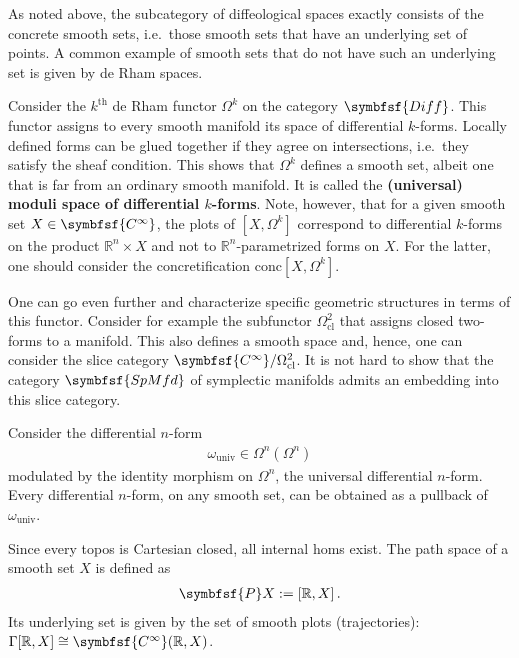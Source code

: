     As noted above, the subcategory of diffeological spaces exactly consists of the concrete smooth sets, i.e.~those smooth sets that have an underlying set of points. A common example of smooth sets that do not have such an underlying set is given by de Rham spaces.
    \begin{example}
        Consider the $k^{\text{th}}$ de Rham functor $\Omega^k$ on the category $\symbfsf{Diff}$. This functor assigns to every smooth manifold its space of differential $k$-forms. Locally defined forms can be glued together if they agree on intersections, i.e.~they satisfy the sheaf condition. This shows that $\Omega^k$ defines a smooth set, albeit one that is far from an ordinary smooth manifold. It is called the \textbf{(universal) moduli space of differential $k$-forms}. Note, however, that for a given smooth set $X\in\symbfsf{C^\infty}$, the plots of $[X,\Omega^k]$ correspond to differential $k$-forms on the product $\mathbb{R}^n\times X$ and not to $\mathbb{R}^n$-parametrized forms on $X$. For the latter, one should consider the concretification $\mathrm{conc}[X,\Omega^k]$.

        One can go even further and characterize specific geometric structures in terms of this functor. Consider for example the subfunctor $\Omega^2_{\text{cl}}$ that assigns closed two-forms to a manifold. This also defines a smooth space and, hence, one can consider the slice category $\symbfsf{C^\infty}/\Omega^2_{\text{cl}}$. It is not hard to show that the category $\symbfsf{SpMfd}$ of symplectic manifolds admits an embedding into this slice category.
    \end{example}
    \begin{property}
        Consider the differential $n$-form
        \begin{gather}
            \omega_{\text{univ}}\in\Omega^n(\Omega^n)
        \end{gather}
        modulated by the identity morphism on $\Omega^n$, the universal differential $n$-form. Every differential $n$-form, on any smooth set, can be obtained as a pullback of $\omega_{\text{univ}}$.
    \end{property}

    \begin{example}
        Since every topos is Cartesian closed, all internal homs exist. The path space of a smooth set $X$ is defined as
        \begin{gather}
            \symbfsf{P}X := [\mathbb{R},X]\,.
        \end{gather}
        Its underlying set is given by the set of smooth plots (trajectories): $\Gamma[\mathbb{R},X]\cong\symbfsf{C^\infty}(\mathbb{R},X)$.
    \end{example}

